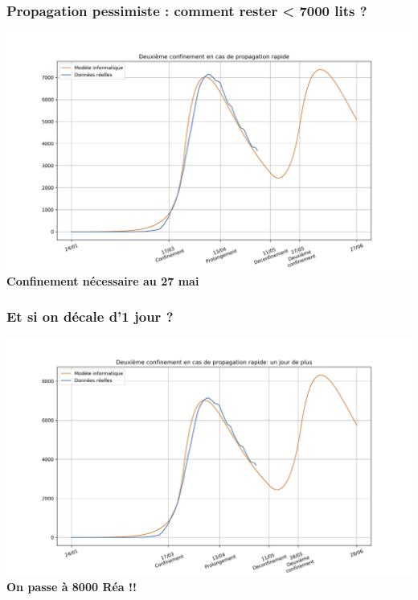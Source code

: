 \documentclass[a4paper]{cours-bdd}
\begin{document}

\begin{frame}[fragile]
\frametitle{Propagation pessimiste : comment rester < 7000 lits ?}
\begin{center}
\includegraphics[width=1.0\linewidth]{figure6.jpg} \\

\textbf{Confinement nécessaire au 27 mai}

  \end{center}
  
\end{frame}


\begin{frame}[fragile]
\frametitle{Et si on décale d'1 jour ?}

\begin{center}
    \includegraphics[width=1.0\linewidth]{figure7.jpg} \\

      \textbf{On passe à 8000 Réa !!}
  \end{center}
  
\end{frame}
\end{document}
